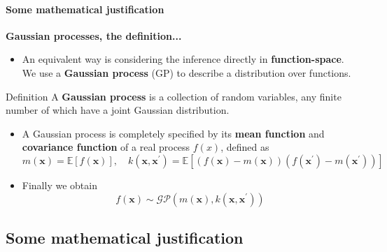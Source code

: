 \begin{frame}{\insertsection}
    \framesubtitle{Some mathematical justification}

    \textcolor{UniGold}{\textbf{Gaussian processes, the definition...}}

    \begin{itemize}
        \item An equivalent way is considering the inference directly in \textcolor{UniOrange}{\textbf{function-space}}. We use a \textcolor{UniOrange}{\textbf{Gaussian process}} (GP) to describe a distribution over functions.
    \end{itemize}

    \begin{block}{Definition}
        A \textcolor{UniBlue}{\textbf{Gaussian process}} is a collection of random variables, any finite number of which have a joint Gaussian distribution.
    \end{block}

    \begin{itemize}
        \item A Gaussian process is completely specified by its \textcolor{UniOrange}{\textbf{mean function}} and \textcolor{UniOrange}{\textbf{covariance function}} of a real process $f (x)$, defined as
        \begin{equation*}
        m(\mathbf{x}) =\mathbb{E}[f(\mathbf{x})], \quad k\left(\mathbf{x}, \mathbf{x}^{\prime}\right) =\mathbb{E}\left[(f(\mathbf{x})-m(\mathbf{x}))\left(f\left(\mathbf{x}^{\prime}\right)-m\left(\mathbf{x}^{\prime}\right)\right)\right]
        \end{equation*}

        \item Finally we obtain
        \begin{equation*}
            f(\mathbf{x}) \sim \mathcal{G} \mathcal{P}\left(m(\mathbf{x}), k\left(\mathbf{x}, \mathbf{x}^{\prime}\right)\right)
        \end{equation*}
    \end{itemize}
\end{frame}

\subsection{Some mathematical justification}

